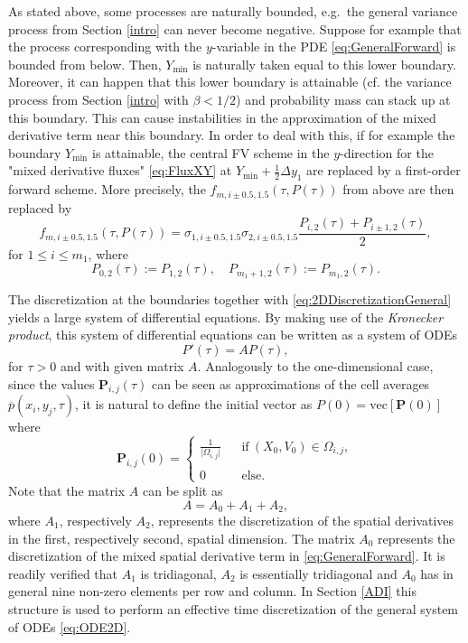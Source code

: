 \documentclass[10pt]{article}
\begin{document}
As stated above, some processes are naturally bounded, e.g.\ the general variance process from Section \ref{intro} can never become negative. 
Suppose for example that the process corresponding with the $y$-variable in the PDE \eqref{eq:GeneralForward} is bounded from below. Then, $Y_{\min}$ is naturally taken equal to this lower boundary. Moreover, it can happen that this lower boundary is attainable (cf. the variance process from Section \ref{intro} with $\beta < 1/2$) and probability mass can stack up at this boundary. This can cause instabilities in the approximation of the mixed derivative term near this boundary. In order to deal with this, if for example the boundary $Y_{\min}$ is attainable, the central FV scheme in the $y$-direction for the "mixed derivative fluxes" \eqref{eq:FluxXY} at $Y_{\min}+\tfrac{1}{2}\Delta y_{1}$ are replaced by a first-order forward scheme. More precisely, the $f_{m,i \pm 0.5, 1.5}(\tau,P(\tau))$ from above are then replaced by
$$ f_{m,i \pm 0.5, 1.5}(\tau,P(\tau)) =  \sigma_{1,i\pm0.5,1.5}\sigma_{2,i\pm0.5,1.5} \frac{P_{i,2}(\tau)+P_{i \pm 1,2}(\tau)}{2}, $$
for $1 \leq i \leq m_{1}$, where
$$ P_{0,2}(\tau) := P_{1,2}(\tau), \quad P_{m_{1}+1,2}(\tau) := P_{m_{1},2}(\tau). $$  

The discretization at the boundaries together with \eqref{eq:2DDiscretizationGeneral} yields a large system of differential equations. By making use of the \textit{Kronecker product}, this system of differential equations can be written as a system of ODEs
\begin{equation}
P'(\tau) = A P(\tau),
\label{eq:ODE2D}
\end{equation} 
for $\tau > 0$ and with given matrix $A$. 
Analogously to the one-dimensional case, since the values $\boldsymbol{P}_{i,j}(\tau)$ can be seen as approximations of the cell averages $\overline{p}(x_{i},y_{j},\tau)$, it is natural to define the initial vector as $P(0) = \mathrm{vec}[\boldsymbol{P}(0)]$ where
$$ \boldsymbol{P}_{i,j}(0) = \left\{ \begin{array}{lll}
\tfrac{1}{\vert \Omega_{i,j} \vert} & & \mathrm{if} \ (X_{0},V_{0}) \in \Omega_{i,j}, \\ \\
0 & & \mathrm{else.}
\end{array} \right. $$
Note that the matrix $A$ can be split as
$$ A = A_{0} + A_{1} + A_{2},$$
where $A_{1}$, respectively $A_{2}$, represents the discretization of the spatial derivatives in the first, respectively second, spatial dimension. The matrix $A_{0}$ represents the discretization of the mixed spatial derivative term in \eqref{eq:GeneralForward}. It is readily verified that $A_{1}$ is tridiagonal, $A_{2}$ is essentially tridiagonal and $A_{0}$ has in general nine non-zero elements per row and column. 
In Section \ref{ADI} this structure is used to perform an effective time discretization of the general system of ODEs \eqref{eq:ODE2D}.
\end{document}
